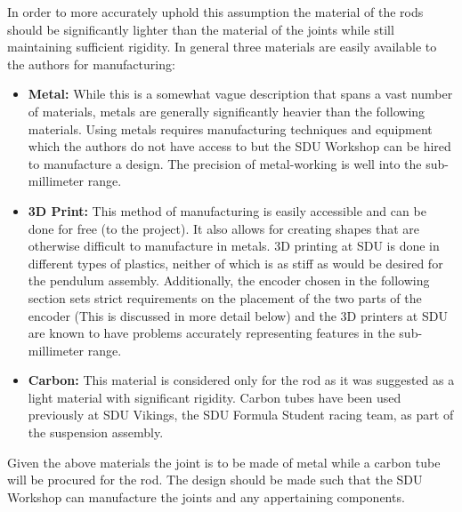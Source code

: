 In order to more accurately uphold this assumption the material of the rods should be significantly lighter than the material of the joints while still maintaining sufficient rigidity.
In general three materials are easily available to the authors for manufacturing:
\begin{itemize}
	\item \textbf{Metal:} While this is a somewhat vague description that spans a vast number of materials, metals are generally significantly heavier than the following materials.
	Using metals requires manufacturing techniques and equipment which the authors do not have access to but the SDU Workshop can be hired to manufacture a design.
	The precision of metal-working is well into the sub-millimeter range.
	\item \textbf{3D Print:} This method of manufacturing is easily accessible and can be done for free (to the project). 
	It also allows for creating shapes that are otherwise difficult to manufacture in metals.
	3D printing at SDU is done in different types of plastics, neither of which is as stiff as would be desired for the pendulum assembly.
	Additionally, the encoder chosen in the following section sets strict requirements on the placement of the two parts of the encoder (This is discussed in more detail below) and the 3D printers at SDU are known to have problems accurately representing features in the sub-millimeter range.
	\item \textbf{Carbon:} This material is considered only for the rod as it was suggested as a light material with significant rigidity.
	Carbon tubes have been used previously at SDU Vikings, the SDU Formula Student racing team, as part of the suspension assembly.
\end{itemize}
Given the above materials the joint is to be made of metal while a carbon tube will be procured for the rod.
The design should be made such that the SDU Workshop can manufacture the joints and any appertaining components.

